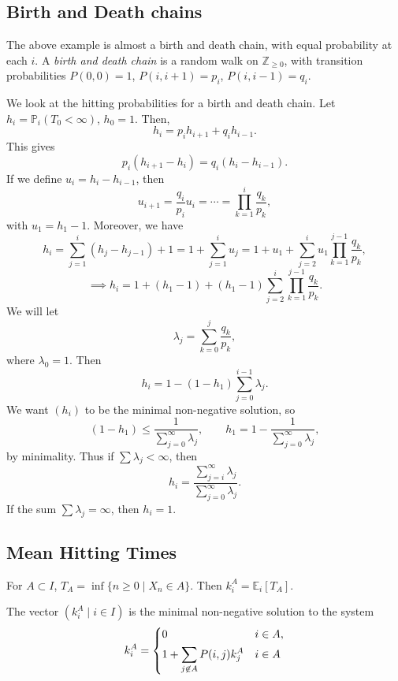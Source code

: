 \documentclass[12pt]{article}
\begin{document}
\subsection{Birth and Death chains}%
\label{sub:birth_and_death_chains}

The above example is almost a birth and death chain, with equal probability at each $i$. A \textit{birth and death chain} is a random walk on $\mathbb{Z}_{\geq 0}$, with transition probabilities $P(0, 0) = 1$, $P(i, i+1) = p_i$, $P(i, i-1) = q_i$.

We look at the hitting probabilities for a birth and death chain. Let $h_i = \mathbb{P}_i(T_0 < \infty)$, $h_0 = 1$. Then,
\[
h_i = p_i h_{i+1} + q_i h_{i-1}
.\]
This gives
\[
	p_i (h_{i+1} - h_i) = q_i(h_{i} - h_{i-1})
.\]
If we define $u_i = h_i - h_{i-1}$, then
\[
u_{i+1} = \frac{q_i}{p_i} u_i = \cdots = \prod_{k = 1}^{i} \frac{q_k}{p_k}
,\]
with $u_1 = h_1 - 1$. Moreover, we have
\[
	h_i = \sum_{j = 1}^{i} (h_{j} - h_{j-1}) + 1 = 1 + \sum_{j = 1}^{i} u_j = 1 + u_1 + \sum_{j = 2}^{i} u_1 \prod_{k = 1}^{j-1} \frac{q_k}{p_k}
,\]
\[
	\implies h_i = 1 + (h_1 - 1) + (h_1 - 1) \sum_{j = 2}^{i} \prod_{k = 1}^{j-1} \frac{q_k}{p_k}
.\]
We will let
\[
\lambda_j = \sum_{k = 0}^{j}\frac{q_k}{p_k}
,\]
where $\lambda_0 = 1$. Then
 \[
	 h_i = 1 - (1 - h_1) \sum_{j = 0}^{i-1} \lambda_j
.\]
We want $(h_i)$ to be the minimal non-negative solution, so
\[
	(1 - h_1) \leq \frac{1}{\sum_{j = 0}^{\infty} \lambda_j}, \qquad
h_1 = 1 - \frac{1}{\sum_{j = 0}^{\infty} \lambda_j}
,\]
by minimality. Thus if $\sum \lambda_j < \infty$, then
\[
h_i = \frac{\sum_{j = i}^{\infty} \lambda_j}{\sum_{j = 0}^{\infty} \lambda_j}
.\]
If the sum $\sum \lambda_j = \infty$, then $h_i = 1$.

\subsection{Mean Hitting Times}%
\label{sub:mean_hitting_times}

For $A \subset I$, $T_A = \inf\{n \geq 0 \mid X_n \in A\}$. Then $k^{A}_i = \mathbb{E}_i[T_A]$.

\begin{theorem}
	The vector $(k_i^{A} \mid i \in I)$ is the minimal non-negative solution to the system
	\[
	k_i^{A} =
	\begin{dcases}
		0 & i \in A, \\
		1 + \sum_{j \not \in A}P(i, j) k_j^{A} & i \in A
	\end{dcases}
	\]
\end{theorem}
\end{document}
